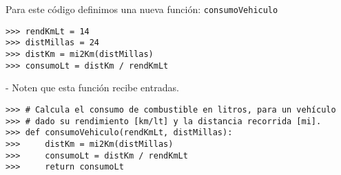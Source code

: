 
\bgnblocknormal
Para este código definimos una nueva función: \texttt{consumoVehiculo}
\trmblocknormal


\begin{lstlisting}
>>> rendKmLt = 14
>>> distMillas = 24
>>> distKm = mi2Km(distMillas)
>>> consumoLt = distKm / rendKmLt
\end{lstlisting}

\trmcolumns

\vfill

- Noten que esta función recibe  entradas.

\vfill

\begin{lstlisting}[style=frame01]
>>> # Calcula el consumo de combustible en litros, para un vehículo
>>> # dado su rendimiento [km/lt] y la distancia recorrida [mi].
>>> def consumoVehiculo(rendKmLt, distMillas):
>>>     distKm = mi2Km(distMillas)
>>>     consumoLt = distKm / rendKmLt
>>>     return consumoLt
\end{lstlisting}

